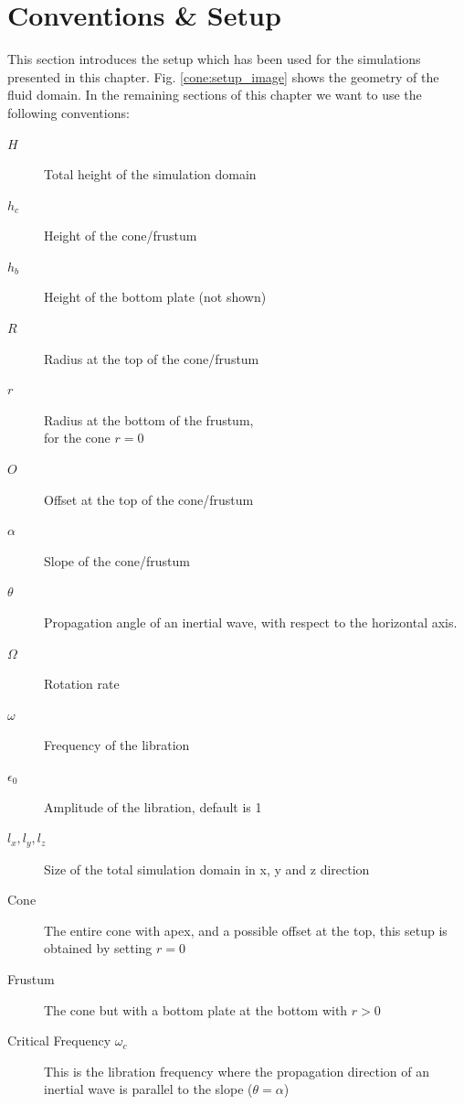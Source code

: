 \section{Conventions \& Setup}
\label{cone:convsetup}

This section introduces the setup which has been used for the simulations presented in this chapter.
Fig. \ref{cone:setup_image} shows the geometry of the fluid domain.
In the remaining sections of this chapter we want to use the following conventions:

\begin{multicols}{2}
\begin{description}
    \item[$H$]{Total height of the simulation domain}
    \item[$h_c$]{Height of the cone/frustum}
    \item[$h_b$]{Height of the bottom plate (not shown)}
    \item[$R$]{Radius at the top of the cone/frustum}
    \item[$r$]{Radius at the bottom  of the frustum,\\ for the cone $r=0$}
    \item[$O$]{Offset at the top of the cone/frustum}
    \item[$\alpha$]{Slope of the cone/frustum}
    \item[$\theta$]{Propagation angle of an inertial wave, with respect to the horizontal axis.}
    \item[$\Omega$]{Rotation rate}
    \item[$\omega$]{Frequency of the libration}
    \item[$\epsilon_0$]{Amplitude of the libration, default is 1}%
    \item[$l_x, l_y, l_z$]{Size of the total simulation domain in x, y and z direction}
    \item[Cone] {The entire cone with apex, and a possible offset at the top, this setup is obtained by setting $r=0$}
    \item[Frustum]{The cone but with a bottom plate at the bottom with $r>0$}
    \item[Critical Frequency $\omega_c$]{This is the libration frequency where the propagation direction of an inertial wave is parallel to the slope ($\theta=\alpha$)}
\end{description}
\end{multicols}

